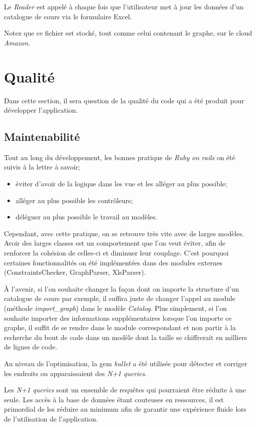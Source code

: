 Le \textit{Reader} est appelé à chaque fois que l'utilisateur met à jour les données d'un catalogue de cours via le formulaire Excel. 


Notez que ce fichier est stocké, tout comme celui contenant le graphe, sur le cloud \textit{Amazon}.
\section{Qualité}
Dans cette section, il sera question de la qualité du code qui a été produit pour développer l'application. 

\subsection{Maintenabilité}

Tout au long du développement, les bonnes pratique de \textit{Ruby on rails} on été suivis à la lettre à savoir;
\begin{itemize}
\item éviter d'avoir de la logique dans les vue et les alléger au plus possible;
\item alléger au plus possible les contrôleurs;
\item déléguer au plus possible le travail au modèles.
\end{itemize}

Cependant, avec cette pratique, on se retrouve très vite avec de larges modèles. Avoir des larges classes est un comportement que l'on veut éviter, afin de renforcer la cohésion de celles-ci et diminuer leur couplage. C'est pourquoi certaines fonctionnalités on été implémentées dans des modules externes (ConstraintsChecker, GraphParser, XlsParser).

À l'avenir, si l'on souhaite changer la façon dont on importe la structure d'un catalogue de cours par exemple, il suffira juste de changer l'appel au module (méthode \textit{import\_graph}) dans le modèle \textit{Catalog}. Plus simplement, si l'on souhaite importer des informations supplémentaires lorsque l'on importe ce graphe, il suffit de se rendre dans le module correspondant et non partir à la recherche du bout de code dans un modèle dont la taille se chiffrerait en milliers de lignes de code.

Au niveau de l'optimisation, la gem \textit{bullet} a été utilisée pour détecter et corriger les endroits ou apparaissaient des \textit{N+1 queries}. 

Les \textit{N+1 queries} sont un ensemble de requêtes qui pourraient être réduite à une seule. Les accès à la base de données étant couteuses en ressources, il est primordial de les réduire au minimum afin de garantir une expérience fluide lors de l'utilisation de l'application. 

